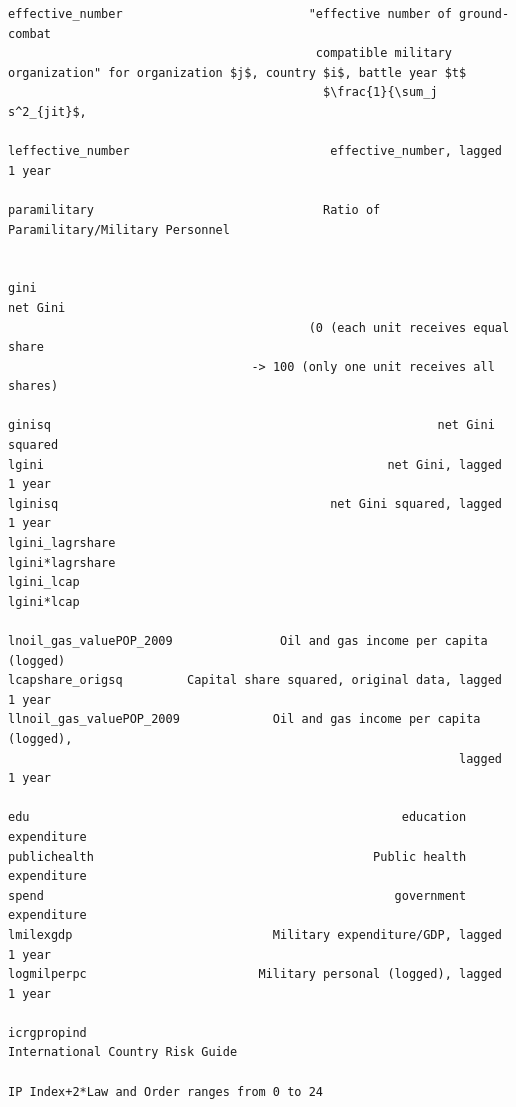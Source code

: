 \documentclass[12pt]{article}
\begin{document}
\begin{verbatim}
effective_number                          "effective number of ground-combat
                                           compatible military organization" for organization $j$, country $i$, battle year $t$
                                       		$\frac{1}{\sum_j s^2_{jit}$, 
                                       
leffective_number                            effective_number, lagged 1 year

paramilitary                                Ratio of Paramilitary/Military Personnel
                                  

gini                                                                net Gini
                                          (0 (each unit receives equal share
                                  -> 100 (only one unit receives all shares)

ginisq                                                      net Gini squared
lgini                                                net Gini, lagged 1 year
lginisq                                      net Gini squared, lagged 1 year
lgini_lagrshare                                              lgini*lagrshare
lgini_lcap                                                        lgini*lcap

lnoil_gas_valuePOP_2009               Oil and gas income per capita (logged)
lcapshare_origsq         Capital share squared, original data, lagged 1 year
llnoil_gas_valuePOP_2009             Oil and gas income per capita (logged),
                                                               lagged 1 year
                                                                            
edu                                                    education expenditure
publichealth                                       Public health expenditure
spend                                                 government expenditure
lmilexgdp                            Military expenditure/GDP, lagged 1 year
logmilperpc                        Military personal (logged), lagged 1 year

icrgpropind                                                      International Country Risk Guide
                                                                        IP Index+2*Law and Order ranges from 0 to 24

\end{verbatim}
\end{document}
